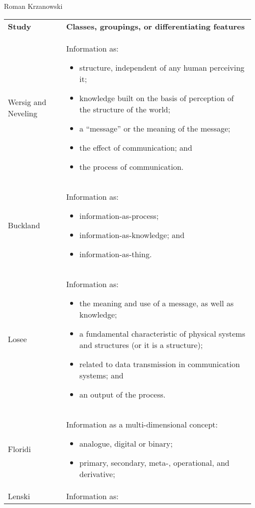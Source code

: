 \begin{artengenv}{Roman Krzanowski}
\begin{small}
\begin{longtable}{p{}p{}}
{\bfseries Study} &
{\bfseries Classes, groupings, or differentiating features}\\
Wersig and Neveling
\parencite*[][]{wersig_phenomena_1975}%
 &
Information as:

\begin{itemize}
\item structure, independent of any human perceiving it;
\item knowledge built on the basis of perception of the structure of the world;
\item a ``message'' or the meaning of the message;
\item the effect of communication; and
\end{itemize}
\begin{itemize}
\item the process of communication.
\end{itemize}
\\
Buckland
\parencite*[][]{buckland_information_1991}%
 &
Information as:

\begin{itemize}
\item information-as-process;
\item information-as-knowledge; and
\item information-as-thing.
\end{itemize}
\\
Losee
\parencite*[][]{losee_discipline_1997}%
 &
Information as:

\begin{itemize}
\item the meaning and use of a message, as well as knowledge;
\item a fundamental characteristic of physical systems and structures (or it is a structure);
\item related to data transmission in communication systems; and
\item an output of the process.
\end{itemize}
\\
Floridi
\parencite*[][]{floridi_philosophy_2010}%
 &
Information as a multi-dimensional concept:

\begin{itemize}
\item analogue, digital or binary;
\item primary, secondary, meta-, operational, and derivative;
\end{itemize}
\\
Lenski
\parencite*[][]{lenski_information_2010}%
 &
Information as:


\end{longtable}
\end{small}
\end{artengenv}
